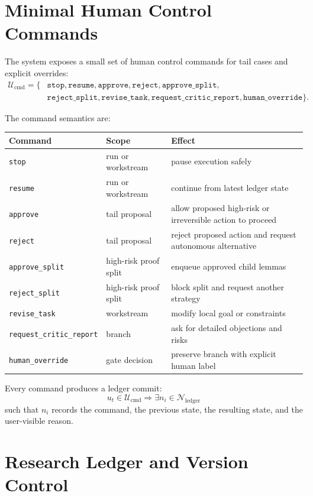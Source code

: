 \documentclass[11pt]{article}
\begin{document}
\section{Minimal Human Control Commands}

The system exposes a small set of human control commands for tail cases and explicit overrides:
$$
\begin{aligned}
\mathcal{U}_{\text{cmd}} = \{ & \texttt{stop}, \texttt{resume}, \texttt{approve}, \texttt{reject}, \texttt{approve\_split}, \\
& \texttt{reject\_split}, \texttt{revise\_task}, \texttt{request\_critic\_report}, \texttt{human\_override} \}.
\end{aligned}
$$

The command semantics are:
\begin{center}
\begin{tabular}{lll}
\toprule
Command & Scope & Effect \\
\midrule
\texttt{stop} & run or workstream & pause execution safely \\
\texttt{resume} & run or workstream & continue from latest ledger state \\
\texttt{approve} & tail proposal & allow proposed high-risk or irreversible action to proceed \\
\texttt{reject} & tail proposal & reject proposed action and request autonomous alternative \\
\texttt{approve\_split} & high-risk proof split & enqueue approved child lemmas \\
\texttt{reject\_split} & high-risk proof split & block split and request another strategy \\
\texttt{revise\_task} & workstream & modify local goal or constraints \\
\texttt{request\_critic\_report} & branch & ask for detailed objections and risks \\
\texttt{human\_override} & gate decision & preserve branch with explicit human label \\
\bottomrule
\end{tabular}
\end{center}

Every command produces a ledger commit:
$$
u_t\in\mathcal{U}_{\text{cmd}} \Rightarrow \exists n_i\in\mathcal{N}_{\text{ledger}}
$$
such that $n_i$ records the command, the previous state, the resulting state, and the user-visible reason.

\section{Research Ledger and Version Control}
\end{document}
